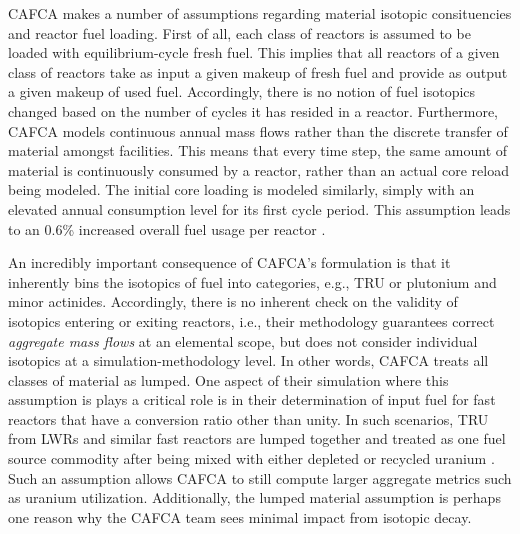 CAFCA makes a number of assumptions regarding material isotopic consituencies
and reactor fuel loading. First of all, each class of reactors is assumed to be
loaded with equilibrium-cycle fresh fuel. This implies that all reactors of a
given class of reactors take as input a given makeup of fresh fuel and provide
as output a given makeup of used fuel. Accordingly, there is no notion of fuel
isotopics changed based on the number of cycles it has resided in a
reactor. Furthermore, CAFCA models continuous annual mass flows rather than the
discrete transfer of material amongst facilities. This means that every time
step, the same amount of material is continuously consumed by a reactor, rather
than an actual core reload being modeled. The initial core loading is modeled
similarly, simply with an elevated annual consumption level for its first cycle
period. This assumption leads to an 0.6\% increased overall fuel usage per
reactor \cite{guerin_impact_2009}.

An incredibly important consequence of CAFCA's formulation is that it inherently
bins the isotopics of fuel into categories, e.g., TRU or plutonium and minor
actinides. Accordingly, there is no inherent check on the validity of isotopics
entering or exiting reactors, i.e., their methodology guarantees
correct \textit{aggregate mass flows} at an elemental scope, but does not
consider individual isotopics at a simulation-methodology level. In other words,
CAFCA treats all classes of material as lumped\cite{guerin_impact_2009}. One
aspect of their simulation where this assumption is plays a critical role is in
their determination of input fuel for fast reactors that have a conversion ratio
other than unity. In such scenarios, TRU from LWRs and similar fast reactors are
lumped together and treated as one fuel source commodity after being mixed with
either depleted or recycled uranium \cite{guerin_impact_2009}. Such an
assumption allows CAFCA to still compute larger aggregate metrics such as
uranium utilization. Additionally, the lumped material assumption is perhaps one
reason why the CAFCA team sees minimal impact from isotopic decay.
